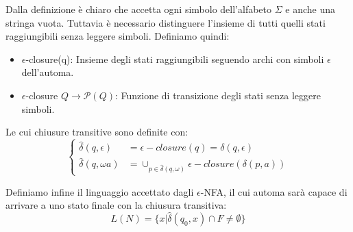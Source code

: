 \noindent Dalla definizione è chiaro che accetta ogni simbolo dell'alfabeto $\Sigma$ e anche una stringa vuota. Tuttavia è necessario distinguere
l'insieme di tutti quelli stati raggiungibili senza leggere simboli. Definiamo quindi: \begin{itemize}
	\item $\epsilon$-closure(q): Insieme degli stati raggiungibili seguendo archi con simboli $\epsilon$ dell'automa.
	\item $\epsilon$-closure $Q\to \mathcal{P}(Q)$: Funzione di transizione degli stati senza leggere simboli.
\end{itemize}

\noindent Le cui chiusure transitive sono definite con: \[ \begin{cases}
	\hat{\delta}(q, \epsilon) &= \epsilon-closure(q) = \delta(q, \epsilon)\\
	\hat{\delta}(q, \omega a) &= \cup_{p \in \hat{\delta}(q, \omega)} \epsilon-closure(\delta(p,a))
\end{cases} \]

\noindent Definiamo infine il linguaggio accettato dagli $\epsilon$-NFA, il cui automa sarà capace di arrivare a uno stato finale con la chiusura
transitiva: \[
	L(N) = \{x | \hat{\delta}(q_0, x) \cap F \neq \emptyset\}
\]